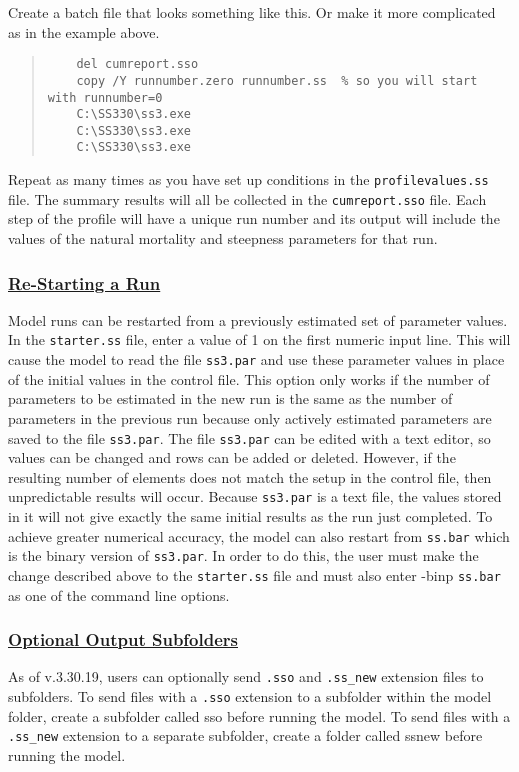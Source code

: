 Create a batch file that looks something like this. Or make it more complicated as in the example above.


\begin{quote}
\begin{verbatim}
	del cumreport.sso
	copy /Y runnumber.zero runnumber.ss  % so you will start with runnumber=0 
	C:\SS330\ss3.exe 
	C:\SS330\ss3.exe 
	C:\SS330\ss3.exe 
\end{verbatim}
\end{quote}


Repeat as many times as you have set up conditions in the \texttt{profilevalues.ss} file.
The summary results will all be collected in the \texttt{cumreport.sso} file. Each step of the profile will have a unique run number and its output will include the values of the natural mortality and steepness parameters for that run.

\hypertarget{RestartRun}{}
\subsubsection[Re-Starting a Run]{\protect\hyperlink{RestartRun}{Re-Starting a Run}}
Model runs can be restarted from a previously estimated set of parameter values. In the \texttt{starter.ss} file, enter a value of 1 on the first numeric input line. This will cause the model to read the file \texttt{ss3.par} and use these parameter values in place of the initial values in the control file. This option only works if the number of parameters to be estimated in the new run is the same as the number of parameters in the previous run because only actively estimated parameters are saved to the file \texttt{ss3.par}. The file \texttt{ss3.par} can be edited with a text editor, so values can be changed and rows can be added or deleted. However, if the resulting number of elements does not match the setup in the control file, then unpredictable results will occur. Because \texttt{ss3.par} is a text file, the values stored in it will not give exactly the same initial results as the run just completed. To achieve greater numerical accuracy, the model can also restart from \texttt{ss.bar} which is the binary version of \texttt{ss3.par}. In order to do this, the user must make the change described above to the \texttt{starter.ss} file and must also enter -binp \texttt{ss.bar} as one of the command line options.

\hypertarget{OutputSubfol}{}
\subsubsection[Optional Output Subfolders]{\protect\hyperlink{OutputSubfol}{Optional Output Subfolders}}
As of v.3.30.19, users can optionally send \texttt{.sso} and \texttt{.ss\_new} extension files to subfolders. To send files with a \texttt{.sso} extension to a subfolder within the model folder, create a subfolder called sso before running the model. To send files with a \texttt{.ss\_new} extension to a separate subfolder, create a folder called ssnew before running the model.

